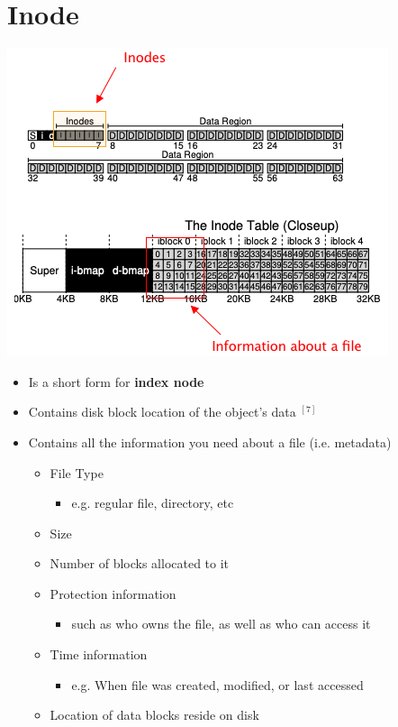 \documentclass[12pt]{article}
\begin{document}
\section*{Inode}

\begin{center}
\includegraphics[width=\linewidth]{../images/midterm_2_solution_23.png}
\end{center}

\begin{itemize}
    \item Is a short form for \textbf{index node}
    \item Contains disk block location of the object's data $^{[7]}$
    \item Contains all the information you need about a file (i.e. metadata)

    \begin{itemize}
        \item File Type
        \begin{itemize}
            \item e.g. regular file, directory, etc
        \end{itemize}
        \item Size
        \item Number of blocks allocated to it
        \item Protection information
        \begin{itemize}
            \item such as who owns the file, as well as who can access it
        \end{itemize}
        \item Time information
        \begin{itemize}
            \item e.g. When file was created, modified, or last accessed
        \end{itemize}
        \item Location of data blocks reside on disk
    \end{itemize}
\end{itemize}
\end{document}
